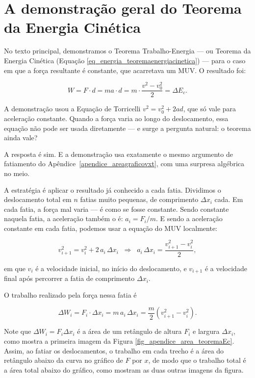 

\chapter{A demonstração geral do Teorema da Energia Cinética} \label{apendice-teoremaenergiacinetica}



No texto principal, demonstramos o Teorema Trabalho-Energia --- ou Teorema da Energia Cinética (Equação \ref{eq_energia_teoremaenergiacinetica}) --- para o caso em
que a força resultante é constante, que acarretava um MUV. O resultado foi:

$$ W = F \cdot d = ma \cdot d = m \cdot \frac{v^2 - v_0^2}{2} = \Delta E_c. $$

A demonstração usou a Equação de Torricelli $v^2 = v_0^2 + 2ad$, que só vale para aceleração constante. Quando a força varia ao longo do deslocamento, essa equação não
pode ser usada diretamente --- e surge a pergunta natural: o teorema ainda
vale?

A resposta é sim. E a demonstração usa exatamente o mesmo argumento de
fatiamento do Apêndice~\ref{apendice_areagraficovxt}, com uma surpresa
algébrica no meio.


A estratégia é aplicar o resultado já conhecido a cada fatia. Dividimos o deslocamento total em $n$ fatias muito pequenas, de comprimento
$\Delta x_i$ cada. Em cada fatia, a força mal varia --- é como se fosse
constante. Sendo constante naquela fatia, a aceleração também o é:
$a_i = F_i/m$. E sendo a aceleração constante em cada fatia, podemos usar
a equação do MUV localmente:

$$ v_{i+1}^2 = v_i^2 + 2\,a_i\,\Delta x_i
   \;\;\Longrightarrow\;\;
   a_i\,\Delta x_i = \frac{v_{i+1}^2 - v_i^2}{2}, $$

   \noindent em que $v_i$ é a velocidade inicial, no início do deslocamento, e $v_{i+1}$ é a velocidade final após percorrer a fatia de comprimento $\Delta x_i.$

O trabalho realizado pela força nessa fatia é

$$ \Delta W_i = F_i \cdot \Delta x_i = m\,a_i\,\Delta x_i
   = \frac{m}{2}\!\left(v_{i+1}^2 - v_i^2\right). $$


Note que $\Delta W_i = F_i \Delta x_i$ é a área de um retângulo de altura $F_i$ e largura $\Delta x_i$, como mostra a primeira imagem da Figura \ref{fig_apendice_area_teoremaEc}. Assim, ao fatiar os deslocamentos, o trabalho em cada trecho é a área do retângulo abaixo da curva no gráfico de $F$ por $x$, de modo que o trabalho total é a área total abaixo do gráfico, como mostram as duas outras imagens da figura.

